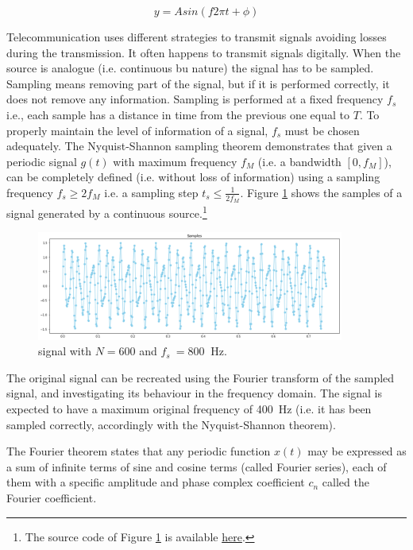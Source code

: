 \begin{equation}
y=Asin(f2\pi t+\phi)
\label{eq_frequency2}
\end{equation}

Telecommunication uses different strategies to transmit signals avoiding losses during the transmission. It often happens to transmit signals digitally. When the source is analogue (i.e. continuous bu nature) the signal has to be sampled. Sampling means removing part of the signal, but if it is performed correctly, it does not remove any information. Sampling is performed at a fixed frequency $f_s$ i.e., each sample has a distance in time from the previous one equal to $T$. To properly maintain the level of information of a signal, $f_s$ must be chosen adequately. The Nyquist-Shannon sampling theorem demonstrates that given a periodic signal $g\left(t\right)$ with maximum frequency $f_M$ (i.e. a bandwidth $[0,f_M]$), can be completely defined (i.e. without loss of information) using a sampling frequency $f_s\geq2f_M$ i.e. a sampling step $t_s\le\frac{1}{2f_M}$. Figure \ref{fig_signalsampling} shows the samples of a signal generated by a continuous source.\footnote{The source code of Figure \ref{fig_signalsampling} is available \href{https://github.com/aletuf93/logproj/blob/master/examples/03.\%20Statistics.ipynb}{here}.}


\begin{figure}[hbt!]
\centering
\includegraphics[width=0.9\textwidth]{SectionLetsMath/elemStat_figures/fig_signalsampling.png}
\captionsetup{type=figure}
\caption{signal with $N=600$ and $f_s\ =800\ $ Hz.}
\label{fig_signalsampling}
\end{figure}

The original signal can be recreated using the Fourier transform of the sampled signal, and investigating its behaviour in the frequency domain. The signal is expected to have a maximum original frequency of 400\ Hz (i.e. it has been sampled correctly, accordingly with the Nyquist-Shannon theorem).\par

The Fourier theorem states that any periodic function $x(t)$ may be expressed as a sum of infinite terms of sine and cosine terms (called Fourier series), each of them with a specific amplitude and phase complex coefficient $c_n$ called the Fourier coefficient. 

